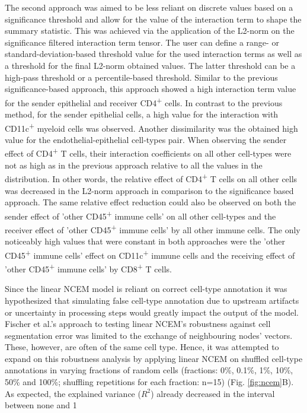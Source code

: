 The second approach was aimed to be less reliant on discrete values based on a significance threshold and allow for the value of the interaction term to shape the summary statistic. This was achieved via the application of the L2-norm on the significance filtered interaction term tensor. The user can define a range- or standard-deviation-based threshold value for the used interaction terms as well as a threshold for the final L2-norm obtained values. The latter threshold can be a high-pass threshold or a percentile-based threshold. Similar to the previous significance-based approach, this approach showed a high interaction term value for the sender epithelial and receiver CD4\textsuperscript{+} cells. In contrast to the previous method, for the sender epithelial cells, a high value for the interaction with CD11c\textsuperscript{+} myeloid cells was observed. Another dissimilarity was the obtained high value for the endothelial-epithelial cell-types pair. When observing the sender effect of CD4\textsuperscript{+} T cells, their interaction coefficients on all other cell-types were not as high as in the previous approach relative to all the values in the distribution. In other words, the relative effect of CD4\textsuperscript{+} T cells on all other cells was decreased in the L2-norm approach in comparison to the significance based approach. The same relative effect reduction could also be observed on both the sender effect of 'other CD45\textsuperscript{+} immune cells' on all other cell-types and the receiver effect of 'other CD45\textsuperscript{+} immune cells' by all other immune cells. The only noticeably high values that were constant in both approaches were the 'other CD45\textsuperscript{+} immune cells' effect on CD11c\textsuperscript{+} immune cells and the receiving effect of 'other CD45\textsuperscript{+} immune cells' by CD8\textsuperscript{+} T cells.

Since the linear NCEM model is reliant on correct cell-type annotation it was hypothesized that simulating false cell-type annotation due to upstream artifacts or uncertainty in processing steps would greatly impact the output of the model. Fischer et al.'s approach to testing linear NCEM's robustness against cell segmentation error was limited to the exchange of neighbouring nodes' vectors. These, however, are often of the same cell type. Hence, it was attempted to expand on this robustness analysis by applying linear NCEM on shuffled cell-type annotations in varying fractions of random cells (fractions: 0\%, 0.1\%, 1\%, 10\%, 50\% and 100\%; shuffling repetitions for each fraction: n=15) (Fig. \ref{fig:ncem}B). As expected, the explained variance ($R^2$) already decreased in the interval between none and 1%

